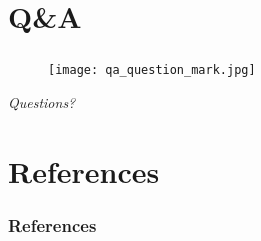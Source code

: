 \documentclass{beamer}
\begin{document}
    \section*{Q\&A}

        {
            \begin{frame}
                \frametitle{\insertsection}
                \begin{figure}
                    \centering
                    \texttt{[image: qa\_question\_mark.jpg]}
                \end{figure}
                \begin{center}
                    \textit{Questions?}
                \end{center}
            \end{frame}
        }

    \section*{References}

        \begin{frame}[allowframebreaks]
            \frametitle{References}
            \printbibliography
        \end{frame}
\end{document}
